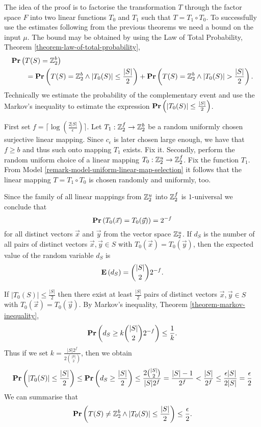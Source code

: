 The idea of the proof is to factorise the transformation $T$ through the factor space $F$ into two linear functions $T_0$ and $T_1$ such that $T = T_1 \circ T_0$. To successfully use the estimates following from the previous theorems we need a bound on the input $\mu$. The bound may be obtained by using the Law of Total Probability, Theorem \ref{theorem-law-of-total-probability},
\[
\begin{split}
& \mathbf{Pr}\left(T(S) = \mathbb{Z}_{2}^{b}\right) \\
& \qquad = \mathbf{Pr}\left(T(S) = \mathbb{Z}_{2}^{b} \wedge |T_0(S)| \leq \frac{|S|}{2}\right) + \mathbf{Pr}\left(T(S) = \mathbb{Z}_{2}^{b} \wedge |T_0(S)| > \frac{|S|}{2}\right) \text{.}
\end{split}
\]
Technically we estimate the probability of the complementary event and use the Markov's inequality to estimate the expression $\mathbf{Pr}\left(|T_0(S)| \leq \frac{|S|}{2}\right)$.

First set $f = \lceil\log(\frac {2|S|}{\epsilon})\rceil$. Let $T_1: \mathbb{Z}_{2}^{f} \rightarrow \mathbb{Z}_{2}^{b}$ be a random uniformly chosen surjective linear mapping. Since $c_\epsilon$ is later chosen large enough, we have that $f \geq b$ and thus such onto mapping $T_1$ exists. Fix it. Secondly, perform the random uniform choice of a linear mapping $T_0: \mathbb{Z}_{2}^{u} \rightarrow \mathbb{Z}_{2}^{f}$. Fix the function $T_1$. From Model \ref{remark-model-uniform-linear-map-selection} it follows that the linear mapping $T = T_1 \circ T_0$ is chosen randomly and uniformly, too.

Since the family of all linear mappings from $\mathbb{Z}_{2}^{u}$ into $\mathbb{Z}_{2}^{f}$ is $1$-universal we conclude that \[ \mathbf{Pr}\left(T_0(\vec{x}) = T_0(\vec{y})\right) = 2 ^ {-f} \] for all distinct vectors $\vec {x}$ and $\vec {y}$ from the vector space $\mathbb{Z}_{2}^{u}$. If $d_S$ is the number of  all pairs of distinct vectors $\vec {x},\vec {y}\in S$ with $T_0(\vec {x}) = T_0(\vec {y})$, then the expected value of the random variable $d_S$ is \[ \mathbf{E}\left(d_S\right)= \binom{|S|}{2} 2 ^ {-f} \text{.} \]

If $|T_0(S)| \leq \frac {|S|}{2}$ then there exist at least $\frac {|S|}{2}$ pairs of distinct vectors $\vec{x}, \vec{y} \in S$ with $T_0(\vec {x}) = T_0(\vec {y})$. By Markov's inequality, Theorem \ref{theorem-markov-inequality}, \[ \mathbf{Pr}\left(d_S \geq k\binom {|S|}{2} 2^{-f}\right) \leq \frac{1}{k} \text{.} \]
Thus if we set $k = \frac {|S|2 ^ f}{2\binom {|S|}{2}}$, then we obtain 
\[ 
	\mathbf{Pr}\left(|T_0(S)| \leq \frac {|S|}{2}\right) 
		\leq \mathbf{Pr}\left(d_S \geq \frac {|S|}{2}\right) 
		\leq \frac{2 \binom{|S|}{2}}{|S|2 ^ f} = \frac{|S| - 1}{2 ^ f} < \frac{|S|}{2 ^ f} 
		\leq \frac{\epsilon |S|}{2|S|} = \frac{\epsilon}{2}
\]
We can summarise that
\[ 
\mathbf{Pr}\left(T(S) \neq \mathbb{Z}_{2}^{b} \wedge |T_0(S)| \leq \frac{|S|}{2}\right) \leq \frac{\epsilon}{2} \text{.}
\]

